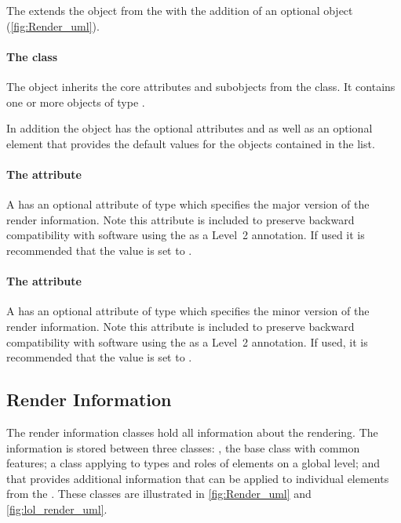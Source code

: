 The \RenderPackage extends the  object from the \LayoutPackage with the addition
of an optional  \ListOfLocalRenderInformation object (\ref{fig:Render_uml}).

\paragraph{The  class}
\label{listoflocalrenderinformation-class}

The \ListOfLocalRenderInformation object inherits the core attributes and subobjects from the 
class. It contains one or more objects of type \LocalRenderInformation.

In addition the \ListOfLocalRenderInformation object has the optional
attributes  and  as well as an optional
\DefaultValues element that provides the default values for the 
\LocalRenderInformation objects contained in the list.

\paragraph{The \fixttspace{} attribute}

A \ListOfLocalRenderInformation has an optional attribute
 of type  which specifies the major version of the render information.  Note this attribute is included to preserve backward compatibility with software using the \RenderPackage as a Level~2 annotation. If used it is recommended that the value is set to .
 
\paragraph{The \fixttspace{} attribute}

A \ListOfLocalRenderInformation has an optional attribute
 of type  which specifies the minor version of the render information.  Note this attribute is included to preserve backward compatibility with software using the \RenderPackage as a Level~2 annotation. If used, it is recommended that the value is set to .
 
\subsection{Render Information}
\label{renderinformation-class}
The render information classes hold all information about the rendering. The
information is stored between three classes: \RenderInformationBase, the base class with 
common features; \GlobalRenderInformation a class applying to types and roles of 
elements on a global level; and \LocalRenderInformation that provides additional information that can be applied to individual elements from the \LayoutPackage. These classes are illustrated in \ref{fig:Render_uml} and \ref{fig:lol_render_uml}.

